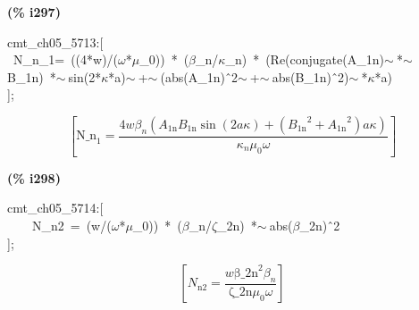\documentclass[fleqn]{article}
\begin{document}
\noindent
\begin{minipage}[t]{4.000000em}\color{red}\bfseries
(\% i297)	
\end{minipage}
\begin{minipage}[t]{\textwidth}\color{blue}
cmt\_ch05\_5713:[\\
\ N\_n\_1=\ ((4*w)/(\ensuremath{\omega}*\ensuremath{\mu}\_0))\ *\ (\ensuremath{\beta}\_n/\ensuremath{\kappa}\_n)\ *\ (Re(conjugate(A\_1n)\ensuremath{\sim\ }*\ensuremath{\sim\ }B\_1n)\ *\ensuremath{\sim\ }sin(2*\ensuremath{\kappa}*a)\ensuremath{\sim\ }+\ensuremath{\sim\ }(abs(A\_1n)\^\ 2\ensuremath{\sim\ }+\ensuremath{\sim\ }abs(B\_1n)\^\ 2)\ensuremath{\sim\ }*\ensuremath{\kappa}*a)\\
];
\end{minipage}
\[\displaystyle \tag{\% o297} 
\left[ {{\ensuremath{\mathrm{N\_ n}}}_1}=\frac{4 w {{\beta }_n} \left( {A_{\ensuremath{\mathrm{1n}}}} {B_{\ensuremath{\mathrm{1n}}}} \sin{\left( 2 a \kappa \right) }+\left( {{{B_{\ensuremath{\mathrm{1n}}}}}^{2}}+{{{A_{\ensuremath{\mathrm{1n}}}}}^{2}}\right)  a \kappa \right) }{{{\kappa }_n} {{\mu }_0} \omega }\right] \mbox{}
\]


\noindent
\begin{minipage}[t]{4.000000em}\color{red}\bfseries
(\% i298)	
\end{minipage}
\begin{minipage}[t]{\textwidth}\color{blue}
cmt\_ch05\_5714:[\\
\ \ \ \ N\_n2\ =\ (w/(\ensuremath{\omega}*\ensuremath{\mu}\_0))\ *\ (\ensuremath{\beta}\_n/\ensuremath{\zeta}\_2n)\ *\ensuremath{\sim\ }abs(\ensuremath{\beta}\_2n)\^\ 2\\
];
\end{minipage}
\[\displaystyle \tag{\% o298} 
\left[ {N_{\ensuremath{\mathrm{n2}}}}=\frac{w {{\ensuremath{\mathrm{\beta \_ 2n}}}^{2}} {{\beta }_n}}{\ensuremath{\mathrm{\zeta \_ 2n}} {{\mu }_0} \omega }\right] \mbox{}
\]
\end{document}
